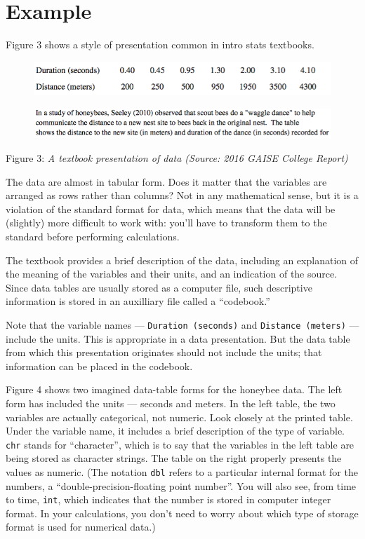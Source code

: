 \documentclass[]{book}
\theoremstyle{definition}
\theoremstyle{definition}
\theoremstyle{definition}
\theoremstyle{remark}
\begin{document}
\section{Example}\label{example}

Figure 3 shows a style of presentation common in intro stats textbooks.

\begin{figure}
\centering
\includegraphics{images/Data-honeybees.png}
\caption{}
\end{figure}

\begin{figure}
\centering
\includegraphics{images/Data-honeybees-1.png}
\caption{}
\end{figure}

Figure 3: \emph{A textbook presentation of data (Source: 2016 GAISE
College Report)}

The data are almost in tabular form. Does it matter that the variables
are arranged as rows rather than columns? Not in any mathematical sense,
but it is a violation of the standard format for data, which means that
the data will be (slightly) more difficult to work with: you'll have to
transform them to the standard before performing calculations.

The textbook provides a brief description of the data, including an
explanation of the meaning of the variables and their units, and an
indication of the source. Since data tables are usually stored as a
computer file, such descriptive information is stored in an auxilliary
file called a ``codebook.''

Note that the variable names --- \texttt{Duration\ (seconds)} and
\texttt{Distance\ (meters)} --- include the units. This is appropriate
in a data presentation. But the data table from which this presentation
originates should not include the units; that information can be placed
in the codebook.

Figure 4 shows two imagined data-table forms for the honeybee data. The
left form has included the units --- seconds and meters. In the left
table, the two variables are actually categorical, not numeric. Look
closely at the printed table. Under the variable name, it includes a
brief description of the type of variable. \texttt{chr} stands for
``character'', which is to say that the variables in the left table are
being stored as character strings. The table on the right properly
presents the values as numeric. (The notation \texttt{dbl} refers to a
particular internal format for the numbers, a
``double-precision-floating point number''. You will also see, from time
to time, \texttt{int}, which indicates that the number is stored in
computer integer format. In your calculations, you don't need to worry
about which type of storage format is used for numerical data.)
\end{document}
